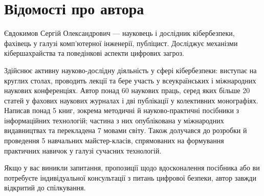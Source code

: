 \chapter *{Відомості про автора}


\label{author:contacts:thanks}

Євдокимов Сергій Олександрович  — науковець і дослідник кібербезпеки, фахівець у галузі комп’ютерної інженерії, публіцист. Досліджує механізми кібершахрайства та поведінкові аспекти цифрових загроз.

Здійснює активну науково-дослідну діяльність у сфері кібербезпеки: виступає на круглих столах, проводить лекції та бере участь у всеукраїнських і міжнародних наукових конференціях. Автор понад 60 наукових праць, серед яких більше 20 статей у фахових наукових журналах і дві публікації у колективних монографіях. Написав понад 5 книг, зокрема методичні й науково-практичні посібники з інформаційних технологій; частина з них опублікована у міжнародних видавництвах та перекладена 7 мовами світу. Також долучався до розробки й проведення 5 навчальних майстер-класів, спрямованих на формування практичних навичок у галузі сучасних технологій.


Якщо у вас виникли запитання, пропозиції щодо вдосконалення посібника або ви потребуєте індивідуальної консультації з питань цифрової безпеки, автор завжди відкритий до спілкування.

\vspace{0.1cm}

